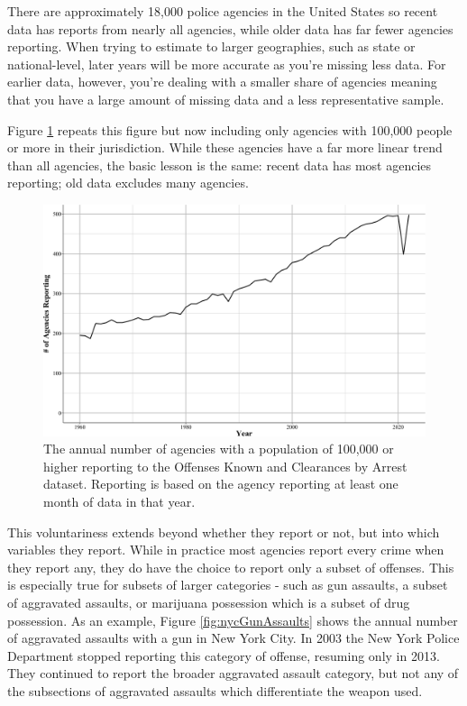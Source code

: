 \documentclass[
  12pt,
  openany]{book}
\begin{document}
There are approximately 18,000 police agencies in the United States so recent data has reports from nearly all agencies, while older data has far fewer agencies reporting. When trying to estimate to larger geographies, such as state or national-level, later years will be more accurate as you're missing less data. For earlier data, however, you're dealing with a smaller share of agencies meaning that you have a large amount of missing data and a less representative sample.

Figure \ref{fig:bigAgenciesReporting} repeats this figure but now including only agencies with 100,000 people or more in their jurisdiction. While these agencies have a far more linear trend than all agencies, the basic lesson is the same: recent data has most agencies reporting; old data excludes many agencies.

\begin{figure}
\centering
\includegraphics{ucrbook_files/figure-latex/bigAgenciesReporting-1.pdf}
\caption{\label{fig:bigAgenciesReporting}The annual number of agencies with a population of 100,000 or higher reporting to the Offenses Known and Clearances by Arrest dataset. Reporting is based on the agency reporting at least one month of data in that year.}
\end{figure}

This voluntariness extends beyond whether they report or not, but into which variables they report. While in practice most agencies report every crime when they report any, they do have the choice to report only a subset of offenses. This is especially true for subsets of larger categories - such as gun assaults, a subset of aggravated assaults, or marijuana possession which is a subset of drug possession. As an example, Figure \ref{fig:nycGunAssaults} shows the annual number of aggravated assaults with a gun in New York City. In 2003 the New York Police Department stopped reporting this category of offense, resuming only in 2013. They continued to report the broader aggravated assault category, but not any of the subsections of aggravated assaults which differentiate the weapon used.
\end{document}
